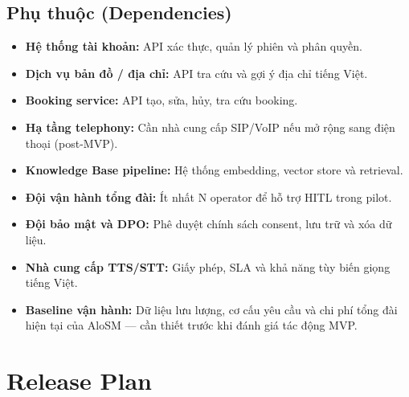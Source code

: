 \documentclass[12pt,a4paper]{article}
\begin{document}
\subsection{Phụ thuộc (Dependencies)}
\begin{itemize}
  \item \textbf{Hệ thống tài khoản:} API xác thực, quản lý phiên và phân quyền.
  \item \textbf{Dịch vụ bản đồ / địa chỉ:} API tra cứu và gợi ý địa chỉ tiếng Việt.
  \item \textbf{Booking service:} API tạo, sửa, hủy, tra cứu booking.
  \item \textbf{Hạ tầng telephony:} Cần nhà cung cấp SIP/VoIP nếu mở rộng sang điện thoại (post-MVP).
  \item \textbf{Knowledge Base pipeline:} Hệ thống embedding, vector store và retrieval.
  \item \textbf{Đội vận hành tổng đài:} Ít nhất N operator để hỗ trợ HITL trong pilot.
  \item \textbf{Đội bảo mật và DPO:} Phê duyệt chính sách consent, lưu trữ và xóa dữ liệu.
  \item \textbf{Nhà cung cấp TTS/STT:} Giấy phép, SLA và khả năng tùy biến giọng tiếng Việt.
  \item \textbf{Baseline vận hành:} Dữ liệu lưu lượng, cơ cấu yêu cầu và chi phí tổng đài hiện tại của AloSM --- cần thiết trước khi đánh giá tác động MVP.
\end{itemize}

\section{Release Plan}
\end{document}
